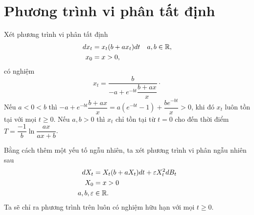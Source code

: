 \section{Phương trình vi phân tất định}
Xét phương trình vi phân tất định
\begin{align*}
    dx_t &= x_t(b+ax_t)dt\quad a,b \in \mathbb{R},\\
    x_0 &= x >0,
\end{align*}
có nghiệm 
\[ x_t = \dfrac{b}{-a+e^{-bt}\dfrac{b+ax}{x}}\cdot\]
Nếu $a<0<b$ thì $-a+e^{-bt}\dfrac{b+ax}{x} = a(e^{-bt}-1)+\dfrac{be^{-bt}}{x} >0$, khi đó $x_t$ luôn tồn tại với mọi $t \geq 0$. Nếu $a,b>0$ thì $x_t$ chỉ tồn tại từ $t = 0$ cho đến thời điểm $T = \dfrac{-1}{b}\ln{\dfrac{ax}{ax+b}}$.

Bằng cách thêm một yếu tố ngẫu nhiên, ta xét phương trình vi phân ngẫu nhiên sau
\begin{align*}
    dX_t &= X_t(b+aX_t)dt + \varepsilon X_t^2dB_t\\
    X_0 &= x >0\\
    a,b,\varepsilon & \in \mathbb{R}.
\end{align*}
Ta sẽ chỉ ra phương trình trên luôn có nghiệm hữu hạn với mọi $t \geq 0$.

